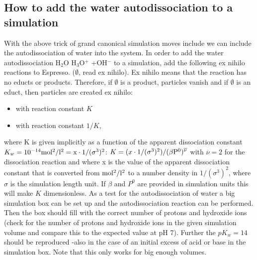 \subsection{How to add the water autodissociation to a simulation}
With the above trick of grand canonical simulation moves include we can include the autodissociation of water into the system.
In order to add the water autodissociation  H$_2$O \arrow{<=>} H$_3$O$^+$ +OH$^-$ \schemestop  to a simulation, add the following ex nihilo reactions to Espresso. ($\emptyset$, read ex nihilo). Ex nihilo means that the reaction has no educts or products. Therefore, if $\emptyset$ is a product, particles vanish and if $\emptyset$ is an educt, then particles are created ex nihilo:
\begin{itemize}
\item {} with reaction constant $K$
\item {} with reaction constant $1/K$,
\end{itemize}
where K is given implicitly as a function of the apparent dissociation constant $K_w=10^{-14} \rm{mol^2/l^2}=x\cdot \rm{1/(\sigma^3)^2}$: $K=(x\cdot \rm{1/(\sigma^3)^2})/(\beta P^0)^{\overline{\nu}}$ with $\overline{\nu}=2$ for the dissociation reaction and where x is the value of the apparent dissociation constant that is converted from $\rm{mol^2/l^2}$ to a number density in $1/(\sigma^3)^2$, where $\sigma$ is the simulation length unit. If $\beta$ and $P^0$ are provided in simulation units this will make $K$ dimensionless. 
As a test for the autodissociation of water a big simulation box can be set up and the autodissociation reaction can be performed. Then the box should fill with the correct number of protons and hydroxide ions (check for the number of protons and hydroxide ions in the given simulation volume and compare this to the expected value at pH 7). Further the $pK_w=14$ should be reproduced -also in the case of an initial excess of acid or base in the simulation box. Note that this only works for big enough volumes.
